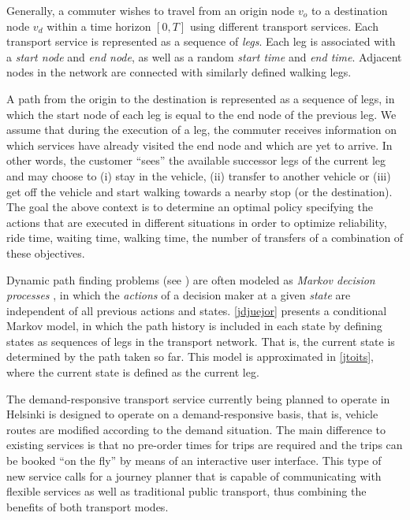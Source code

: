 \documentclass[dissertation,draft*]{aaltoseries}
\begin{document}
Generally, a commuter wishes to travel from an origin node $v_o$ 
to a destination node $v_d$ within a time horizon $[0,T]$ using different transport services.
Each transport service is represented as a sequence of \emph{legs}. Each leg is associated
with a \emph{start node} and \emph{end node}, as well as a random \emph{start time} and \emph{end time}.
Adjacent nodes in the network are connected with similarly defined walking legs. %

A path from the origin to the
destination is represented as a sequence of legs, in which the start node of
each leg is equal to the end node of the previous leg.
We assume that during the execution of a leg, 
the commuter receives information on which
services have already visited the end node %
and which are yet to arrive.
In other words, the customer ``sees'' the available successor legs of the current leg
and may choose to (i) stay in the vehicle, %
(ii) transfer to another vehicle or (iii) get off the vehicle and start
walking towards a nearby stop (or the destination).
The goal the above context is to determine an optimal policy specifying the actions
that are executed in different situations in order to 
optimize reliability, ride time, waiting time, walking time, the number of transfers
of a combination of these objectives.

Dynamic path finding problems (see \cite{hall,bander2002,fu1998,miller-hooks2000,davies,kim2005a,kim2005b,azaron,ferris,thomas,waller}) are often modeled
as \emph{Markov decision processes} \cite{psaraftis93,polychronopoulos}, in which the 
\emph{actions} of a decision maker at a given \emph{state} are independent of all previous actions and states.
\ref{jdjuejor} presents a conditional Markov model, in which the path history is included in each state by
defining states as sequences of legs in the transport network.
That is, the current state is determined by the path taken so far.
This model is approximated in \ref{jtoits}, where the current state is defined as the current leg.

The demand-responsive transport service currently being planned to operate in Helsinki
is designed to operate on a demand-responsive basis, that is, 
vehicle routes are modified according to the demand situation. The main difference to existing services is 
that no pre-order times for trips are required and the trips can be booked
``on the fly'' by means of an interactive user interface. 
This type of new service calls for a journey planner that is
capable of communicating with flexible services as well as traditional
public transport, thus combining the benefits of both transport modes.
\end{document}
